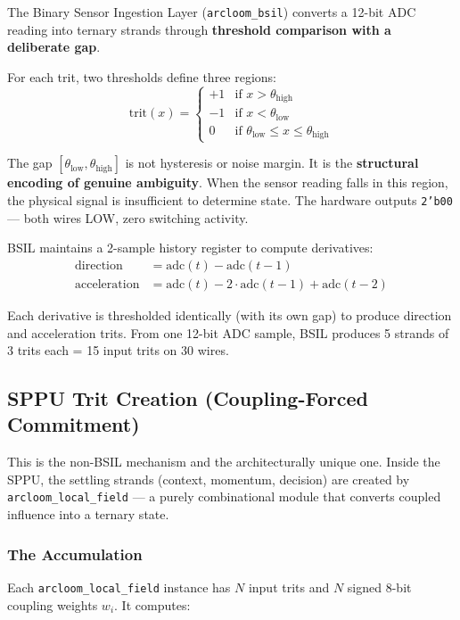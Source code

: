 \documentclass[11pt,a4paper]{article}
\begin{document}
The Binary Sensor Ingestion Layer (\texttt{arcloom\_bsil}) converts a 12-bit ADC reading into ternary strands through \textbf{threshold comparison with a deliberate gap}.

For each trit, two thresholds define three regions:
\begin{equation}
\text{trit}(x) = \begin{cases}
+1 & \text{if } x > \theta_{\text{high}} \\
-1 & \text{if } x < \theta_{\text{low}} \\
0  & \text{if } \theta_{\text{low}} \leq x \leq \theta_{\text{high}}
\end{cases}
\end{equation}

The gap $[\theta_{\text{low}}, \theta_{\text{high}}]$ is not hysteresis or noise margin. It is the \textbf{structural encoding of genuine ambiguity}. When the sensor reading falls in this region, the physical signal is insufficient to determine state. The hardware outputs \texttt{2'b00} --- both wires LOW, zero switching activity.

BSIL maintains a 2-sample history register to compute derivatives:
\begin{align}
\text{direction} &= \text{adc}(t) - \text{adc}(t-1) \\
\text{acceleration} &= \text{adc}(t) - 2 \cdot \text{adc}(t-1) + \text{adc}(t-2)
\end{align}

Each derivative is thresholded identically (with its own gap) to produce direction and acceleration trits. From one 12-bit ADC sample, BSIL produces 5 strands of 3 trits each = 15 input trits on 30 wires.

\subsection{SPPU Trit Creation (Coupling-Forced Commitment)}

This is the non-BSIL mechanism and the architecturally unique one. Inside the SPPU, the settling strands (context, momentum, decision) are created by \texttt{arcloom\_local\_field} --- a purely combinational module that converts coupled influence into a ternary state.

\subsubsection{The Accumulation}

Each \texttt{arcloom\_local\_field} instance has $N$ input trits and $N$ signed 8-bit coupling weights $w_i$. It computes:
\end{document}

